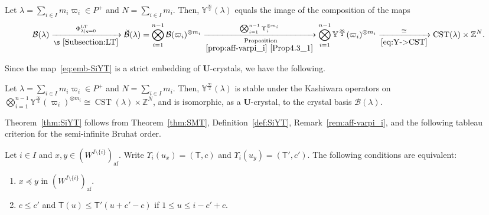 \documentclass[ALCO,ThmDefs,Unicode,epreuves]{cedram}
\newcommand{\BZ}{\mathbb{Z}}
\renewcommand{\U}{\mathbf{U}}
\newcommand{\si}{\frac{\infty}{2}}
\DeclareMathOperator{\af}{af}
\DeclareMathOperator{\LT}{LT}
\DeclareMathOperator{\CST}{CST}
\begin{document}
\begin{theo} \label{thm:SiYT}
Let 
$\lambda = \sum_{i \in I} m_i \varpi_i \in P^+$
and 
$N = \sum_{i \in I} m_i$. 
Then, 
$\mathbb{Y}^{\si}(\lambda)$ 
equals the image of the composition of the maps
\begin{align} \label{eq:emb-SiYT}
\mathcal{B}(\lambda) 
\xrightarrow[\S~\ref{Subsection:LT}]{\Phi_{\lambda \mid q=0}^{\LT }}
\Breve{\mathcal{B}}(\lambda) 
= 
\bigotimes_{i=1}^{n-1} \mathcal{B}(\varpi_i)^{\otimes m_i}
\xrightarrow[\begin{subarray}{c}\ \textup{Proposition} \\ %
{\ref{prop:aff-varpi_i}}~\ref{Prop4.3_1} \end{subarray}]{\bigotimes_{i=1}^{n-1} \Upsilon_i^{\otimes m_i}} 
\bigotimes_{i=1}^{n-1} \mathbb{Y}^{\si}(\varpi_i)^{\otimes m_i}
\xrightarrow[\eqref{eq:Y->CST}]{\cong}
\CST (\lambda) \times \BZ^N .
\end{align}
\end{theo}

Since the map~\eqref{eq:emb-SiYT} is a strict embedding of $\U$-crystals, 
we have the following.

\begin{coro} \label{cor:isom}
Let 
$\lambda = \sum_{i \in I} m_i \varpi_i \in P^+$
and 
$N = \sum_{i \in I} m_i$. 
Then, 
$\mathbb{Y}^{\si}(\lambda)$ 
is stable under the Kashiwara operators 
on 
$\bigotimes_{i=1}^{n-1} \mathbb{Y}^{\si}(\varpi_i)^{\otimes m_i} \cong \CST (\lambda) \times \BZ^N$, 
and is isomorphic, as a $\U$-crystal, to the crystal basis 
$\mathcal{B}(\lambda)$.
\end{coro}

Theorem~\ref{thm:SiYT} follows from 
Theorem~\ref{thm:SMT}, Definition~\ref{def:SiYT}, Remark~\ref{rem:aff-varpi_i}, 
and the following tableau criterion for the semi-infinite Bruhat order. 

\begin{theo} \label{thm:tab-cri}
Let 
$i \in I$ 
and 
$x,y \in (W^{I \setminus \{ i \}})_{\af}$. 
Write 
$\Upsilon_i(u_x) = (\mathsf{T},c)$
and 
$\Upsilon_i(u_y) = (\mathsf{T}',c')$. 
The following conditions are equivalent:
\begin{enumerate}[label=(\arabic*)]
\item\label{Theo4.7_1}
$x \preceq y$ 
in 
$(W^{I \setminus \{ i \}})_{\af}$. 
\item\label{Theo4.7_2}
$c \leq c'$ 
and 
$\mathsf{T}(u) \leq \mathsf{T}'(u + c' - c)$ 
if 
$1 \leq u \leq i - c' + c$. 
\end{enumerate}
\end{theo}
\end{document}
